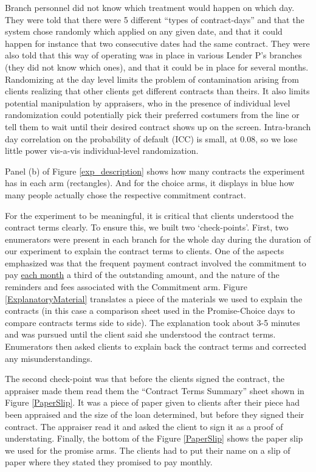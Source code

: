 \documentclass[oneside,11pt]{article}
\begin{document}
 Branch personnel did not know which treatment would happen on which day. They were told that there were 5 different ``types of contract-days'' and that the system chose randomly which applied on any given date, and that it could happen for instance that two consecutive dates had the same contract. They were also told that this way of operating was in place in various Lender P's branches (they did not know which ones), and that it could be in place for several months. Randomizing at the day level limits the problem of contamination arising from clients realizing that other clients get different contracts than theirs. It also limits potential manipulation by appraisers, who in the presence of individual level randomization could potentially pick their preferred costumers from the line or tell them to wait until their desired contract shows up on the screen. Intra-branch day correlation on the probability of default (ICC) is small, at {0.08}, so we lose little power vis-a-vis individual-level randomization.



Panel (b) of Figure \ref{exp_description} shows how many contracts the experiment has in each arm (rectangles). And for the choice arms, it displays in blue how many people actually chose the respective commitment contract.



For the experiment to be meaningful, it is critical that clients understood the contract terms clearly.  To ensure this, we built two `check-points'.  First, two enumerators were present in each branch for the whole day during the duration of our experiment to explain the contract terms to clients. One of the aspects emphasized was that the frequent payment contract involved the commitment to pay \underline{each month} a third of the outstanding amount, and the nature of the reminders and fees associated with the Commitment arm.  Figure \ref{ExplanatoryMaterial} translates a piece of the materials we used to explain the contracts (in this case a comparison sheet used in the Promise-Choice days to compare contracts terms side to side). The explanation took about 3-5 minutes and was pursued until the client said she understood the contract terms. Enumerators then asked clients to explain back the contract terms and corrected any misunderstandings. 

The second check-point was that before the clients signed the contract, the appraiser made them read them the ``Contract Terms Summary'' sheet shown in Figure \ref{PaperSlip}. It was a piece of paper given to clients after their piece had been appraised and the size of the loan determined, but before they signed their contract. The appraiser read it and asked the client to sign it as a proof of understating. %
Finally, the bottom of the Figure \ref{PaperSlip} shows the paper slip we used for the promise arms. The clients had to put their name on a slip of paper where they stated they promised to pay monthly.
\end{document}
